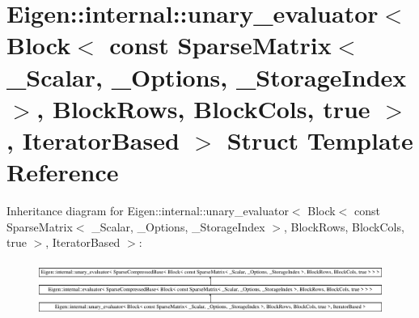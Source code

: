 \hypertarget{struct_eigen_1_1internal_1_1unary__evaluator_3_01_block_3_01const_01_sparse_matrix_3_01___scalarcdbc8f3eebef46901de7cc88abb0e702}{}\section{Eigen\+::internal\+::unary\+\_\+evaluator$<$ Block$<$ const Sparse\+Matrix$<$ \+\_\+\+Scalar, \+\_\+\+Options, \+\_\+\+Storage\+Index $>$, Block\+Rows, Block\+Cols, true $>$, Iterator\+Based $>$ Struct Template Reference}
\label{struct_eigen_1_1internal_1_1unary__evaluator_3_01_block_3_01const_01_sparse_matrix_3_01___scalarcdbc8f3eebef46901de7cc88abb0e702}
Inheritance diagram for Eigen\+::internal\+::unary\+\_\+evaluator$<$ Block$<$ const Sparse\+Matrix$<$ \+\_\+\+Scalar, \+\_\+\+Options, \+\_\+\+Storage\+Index $>$, Block\+Rows, Block\+Cols, true $>$, Iterator\+Based $>$\+:\begin{figure}[H]
\begin{center}
\leavevmode
\includegraphics[height=1.800643cm]{struct_eigen_1_1internal_1_1unary__evaluator_3_01_block_3_01const_01_sparse_matrix_3_01___scalarcdbc8f3eebef46901de7cc88abb0e702}
\end{center}
\end{figure}
